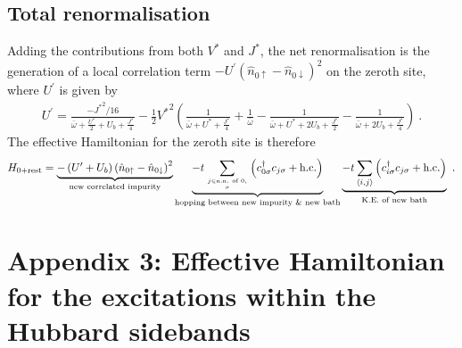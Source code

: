 \subsection{Total renormalisation}
Adding the contributions from both \(V^*\) and \(J^*\),  the net renormalisation is the generation of a local correlation term \(-U^\prime\left(\hat n_{ 0\uparrow} - \hat n_{0 \downarrow}\right)^2\) on the zeroth site, where \(U^\prime\) is given by
\begin{eqnarray}
	U^\prime = \frac{-{J^*}^2/16}{\bar\omega + \frac{U^*}{2} + U_b + \frac{J^*}{4}} - \frac{1}{2}{V^*}^2\left(\frac{1}{\bar\omega + U^* + \frac{J^*}{4}} + \frac{1}{\bar\omega} - \frac{1}{\bar\omega + U^* + 2U_b + \frac{J^*}{2}} - \frac{1}{\bar\omega + 2U_b + \frac{J^*}{4}}\right)~.
\end{eqnarray}
The effective Hamiltonian for the zeroth site is therefore
\begin{eqnarray}
	H_\text{0+rest} = \underbrace{-\left(U^\prime + U_b\right)\left(\hat n_{0\uparrow} - \hat n_{0\downarrow}\right)^2}_\text{new correlated impurity} \underbrace{- t\sum_{j\in \text{n.n. of 0},\atop{\sigma}}\left(c^\dagger_{0\sigma}c_{j\sigma} + \text{h.c.}\right)}_\text{hopping between new impurity \& new bath} \underbrace{-t \sum_{\left<i,j \right>}\left(c^\dagger_{i\sigma}c_{j\sigma} + \text{h.c.}\right)}_\text{K.E. of new bath}~.
\end{eqnarray}

\section*{Appendix 3: Effective Hamiltonian for the excitations within the Hubbard sidebands}

